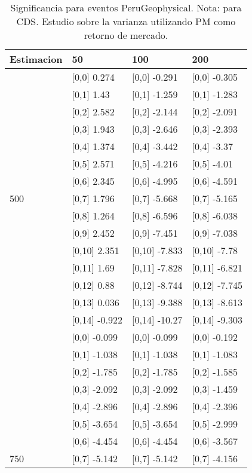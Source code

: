 \begin{table}

\caption{Significancia para eventos PeruGeophysical. Nota: para CDS. Estudio sobre la varianza utilizando PM como retorno de mercado.}
\centering
\begin{tabular}[t]{llll}
\toprule
Estimacion & 50 & 100 & 200\\
\midrule
 & {}[0,0] 0.274 & {}[0,0] -0.291 & {}[0,0] -0.305\\
 & {}[0,1] 1.43 & {}[0,1] -1.259 & {}[0,1] -1.283\\
 & {}[0,2] 2.582 & {}[0,2] -2.144 & {}[0,2] -2.091\\
 & {}[0,3] 1.943 & {}[0,3] -2.646 & {}[0,3] -2.393\\
 & {}[0,4] 1.374 & {}[0,4] -3.442 & {}[0,4] -3.37\\
\addlinespace
 & {}[0,5] 2.571 & {}[0,5] -4.216 & {}[0,5] -4.01\\
 & {}[0,6] 2.345 & {}[0,6] -4.995 & {}[0,6] -4.591\\
500 & {}[0,7] 1.796 & {}[0,7] -5.668 & {}[0,7] -5.165\\
 & {}[0,8] 1.264 & {}[0,8] -6.596 & {}[0,8] -6.038\\
 & {}[0,9] 2.452 & {}[0,9] -7.451 & {}[0,9] -7.038\\
\addlinespace
 & {}[0,10] 2.351 & {}[0,10] -7.833 & {}[0,10] -7.78\\
 & {}[0,11] 1.69 & {}[0,11] -7.828 & {}[0,11] -6.821\\
 & {}[0,12] 0.88 & {}[0,12] -8.744 & {}[0,12] -7.745\\
 & {}[0,13] 0.036 & {}[0,13] -9.388 & {}[0,13] -8.613\\
 & {}[0,14] -0.922 & {}[0,14] -10.27 & {}[0,14] -9.303\\
\addlinespace
 & {}[0,0] -0.099 & {}[0,0] -0.099 & {}[0,0] -0.192\\
 & {}[0,1] -1.038 & {}[0,1] -1.038 & {}[0,1] -1.083\\
 & {}[0,2] -1.785 & {}[0,2] -1.785 & {}[0,2] -1.585\\
 & {}[0,3] -2.092 & {}[0,3] -2.092 & {}[0,3] -1.459\\
 & {}[0,4] -2.896 & {}[0,4] -2.896 & {}[0,4] -2.396\\
\addlinespace
 & {}[0,5] -3.654 & {}[0,5] -3.654 & {}[0,5] -2.999\\
 & {}[0,6] -4.454 & {}[0,6] -4.454 & {}[0,6] -3.567\\
750 & {}[0,7] -5.142 & {}[0,7] -5.142 & {}[0,7] -4.156\\

\end{tabular}
\end{table}
